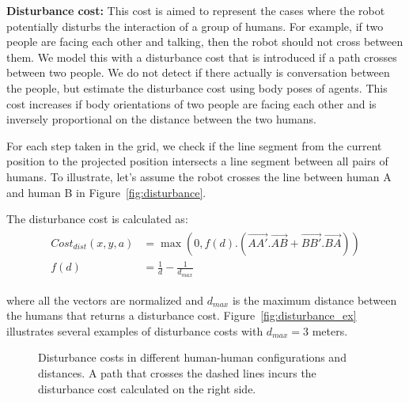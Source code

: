 \textbf{Disturbance cost:} This cost is aimed to represent the cases where the robot potentially disturbs the interaction of a group of humans. For example, if two people are facing each other and talking, then the robot should not cross between them.  We model this with a disturbance cost that is introduced if a path crosses between two people. We do not detect if there actually is conversation between the people, but estimate the disturbance cost using body poses of agents. This cost increases if body orientations of two people are facing each other and is inversely proportional on the distance between the two humans.

For each step taken in the grid, we check if the line segment from the current position to the  projected position intersects a line segment between all pairs of humans. To illustrate, let's assume the robot crosses the line between human A and human B in Figure~\ref{fig:disturbance}. 

The disturbance cost is calculated as:
\begin{align} 
\begin{split} 
Cost_{dist}(x,y,a)&=\max(0, f(d).(\vec{AA'}.\vec{AB}+\vec{BB'}.\vec{BA})) \\
f(d)&=\frac{1}{d}-\frac{1}{d_{max}}
\end{split} 
\end{align}

where all the vectors are normalized and $d_{max}$ is the maximum distance between the humans that returns a disturbance cost. Figure~\ref{fig:disturbance_ex} illustrates several examples of disturbance costs with $d_{max}=3$ meters.

\begin{figure}[ht!]
\centering
%
    \caption{%
	Disturbance costs in different human-human configurations and distances. A path that crosses the dashed lines incurs the disturbance cost calculated on the right side.
     }%
   \label{fig:sim}
   \vspace{-0.2cm}
\end{figure}



